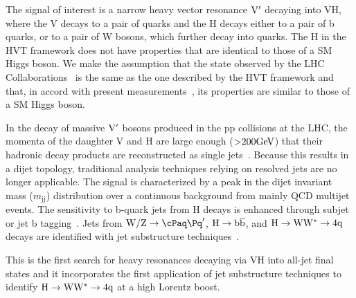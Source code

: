 The signal of interest is a narrow heavy vector resonance ${\rm V'}$ decaying into
VH, where the V decays to a pair of quarks and the H decays either to
a pair of b quarks, or to a pair of W bosons, which further decay into
quarks.
The H in the HVT framework does not have properties that are identical 
to those of a SM Higgs boson. We make the assumption that the state 
observed by the LHC Collaborations~\cite{higgsdiscoveryAtlas,Chatrchyan:2012ufa} 
is the same as the one described by the HVT framework and 
that, in accord with present 
measurements~\cite{Khachatryan:2014kcaCMSHiggs1,Khachatryan:2014jbaCMSHiggs2,AtlasHiggs1}, 
its properties are similar to those of a SM Higgs boson.
  
In the decay of massive ${\rm V'}$ bosons 
produced in the pp collisions at the LHC, 
the momenta of the daughter V and H are large enough (${>} 200\mathrm{GeV}$) 
that their hadronic decay products 
are reconstructed as single jets~\cite{Gouzevitch:2013qca}. 
Because this results in a dijet topology, 
traditional analysis techniques relying on resolved jets are 
no longer applicable. The signal is characterized by a peak 
in the dijet invariant mass ($m_\mathrm{jj}$) distribution 
over a continuous background from mainly QCD multijet 
events. The sensitivity to b-quark jets 
from H decays is enhanced through 
subjet or jet b tagging~\cite{BTV-13-001}. 
Jets from ${\rm \Vqq}$, ${\rm H\to\mathrm{b\overline{b}}}$, and ${\rm H\to{\rm W}{\rm W}^*\to4{\rm q}}$ 
decays are identified with jet 
substructure techniques~\cite{topwtag_pas,JME-13-006}.


This is the first search for heavy resonances 
decaying via VH into all-jet final states 
and it incorporates the first application of jet substructure 
techniques to identify ${\rm H\to{\rm W}{\rm W}^*\to4{\rm q}}$ at a high Lorentz boost.


